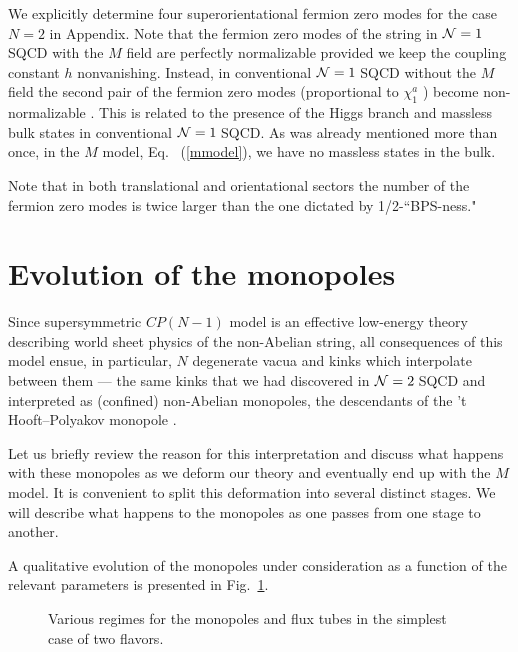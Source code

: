 \documentclass[epsfig,12pt]{article}
\newcommand{\ntwo}{${\cal N}=2\;$}
\newcommand{\none}{${\cal N}=1\;$}
\begin{document}
We explicitly determine four superorientational fermion zero modes 
for the case $N=2$ in Appendix.
Note that the fermion zero modes of the string in \none SQCD with the $M$ field 
are perfectly normalizable provided we keep the coupling constant
$h$ nonvanishing. Instead, in conventional
\none SQCD without the $M$ field the second pair of the fermion zero modes (proportional to $\chi_1^a$ ) become non-normalizable \cite{SYnone}. 
This is related to the presence of the Higgs branch and 
massless bulk states in conventional
\none SQCD. As was already mentioned more than once,
in the $M$ model, Eq.~ (\ref{mmodel}), we have no massless states in the bulk.

Note that in both translational and orientational sectors the number of the fermion 
zero modes is twice larger than the one dictated by 1/2-``BPS-ness."


\section{Evolution of the monopoles}
\label{evol}
\setcounter{equation}{0}

Since supersymmetric  $CP(N-1)$ model is an  effective
low-energy theory describing world sheet physics  of the non-Abelian string,
all consequences of this model ensue, in particular, $N$ degenerate vacua and  kinks
which interpolate between them --- the same kinks
that we had discovered in \ntwo  SQCD \cite{SYmon} and interpreted as 
(confined) non-Abelian monopoles, the descendants  
of the 't Hooft--Polyakov monopole \cite{thopo}.

Let us briefly review  the reason for this interpretation
\cite{Tong,SYmon,HT2} and discuss what happens with these monopoles
as we deform our theory and eventually end up with the $M$ model. 
It is convenient to split this deformation into several distinct stages.
We will describe what happens to the monopoles as one passes 
from one stage to another.

A qualitative evolution of the monopoles under consideration
as a function of the  relevant parameters is presented in
Fig.~\ref{twoabcd}.

\begin{figure}[h]
\epsfxsize=10cm
\centerline{}
\caption{\footnotesize
Various regimes for the monopoles and
flux tubes in the simplest case of two flavors.}
\label{twoabcd}
\end{figure}
\end{document}
